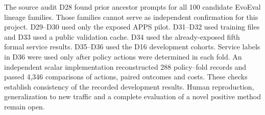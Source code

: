 \documentclass[11pt]{article}
\begin{document}
The source audit D28 found prior ancestor prompts for all 100 candidate EvoEval lineage families. Those families cannot serve as independent confirmation for this project. D29--D30 used only the exposed APPS pilot. D31--D32 used training files and D33 used a public validation cache. D34 used the already-exposed fifth formal service results. D35--D36 used the D16 development cohorts. Service labels in D36 were used only after policy actions were determined in each fold. An independent scalar implementation reconstructed 288 policy--fold records and passed 4,346 comparisons of actions, paired outcomes and costs. These checks establish consistency of the recorded development results. Human reproduction, generalization to new traffic and a complete evaluation of a novel positive method remain open.
\end{document}
